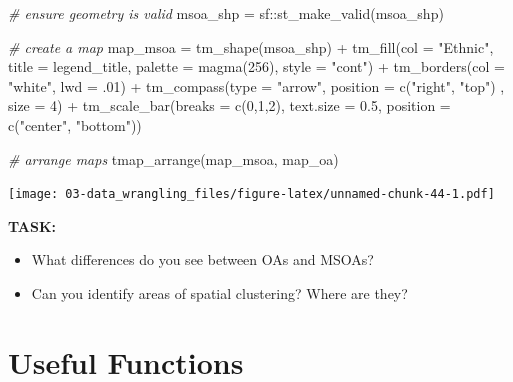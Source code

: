\documentclass[
]{book}
\newenvironment{Shaded}{\begin{snugshade}}{\end{snugshade}}
\newcommand{\AttributeTok}[1]{\textcolor[rgb]{0.77,0.63,0.00}{#1}}
\newcommand{\CommentTok}[1]{\textcolor[rgb]{0.56,0.35,0.01}{\textit{#1}}}
\newcommand{\DecValTok}[1]{\textcolor[rgb]{0.00,0.00,0.81}{#1}}
\newcommand{\FloatTok}[1]{\textcolor[rgb]{0.00,0.00,0.81}{#1}}
\newcommand{\FunctionTok}[1]{\textcolor[rgb]{0.00,0.00,0.00}{#1}}
\newcommand{\NormalTok}[1]{#1}
\newcommand{\OtherTok}[1]{\textcolor[rgb]{0.56,0.35,0.01}{#1}}
\newcommand{\SpecialCharTok}[1]{\textcolor[rgb]{0.00,0.00,0.00}{#1}}
\newcommand{\StringTok}[1]{\textcolor[rgb]{0.31,0.60,0.02}{#1}}
\providecommand{\tightlist}{%
  \setlength{\itemsep}{0pt}\setlength{\parskip}{0pt}}
\begin{document}
\begin{Shaded}
\begin{Highlighting}[]
\CommentTok{\# ensure geometry is valid}
\NormalTok{msoa\_shp }\OtherTok{=}\NormalTok{ sf}\SpecialCharTok{::}\FunctionTok{st\_make\_valid}\NormalTok{(msoa\_shp)}

\CommentTok{\# create a map}
\NormalTok{map\_msoa }\OtherTok{=} \FunctionTok{tm\_shape}\NormalTok{(msoa\_shp) }\SpecialCharTok{+}
  \FunctionTok{tm\_fill}\NormalTok{(}\AttributeTok{col =} \StringTok{"Ethnic"}\NormalTok{, }\AttributeTok{title =}\NormalTok{ legend\_title, }\AttributeTok{palette =} \FunctionTok{magma}\NormalTok{(}\DecValTok{256}\NormalTok{), }\AttributeTok{style =} \StringTok{"cont"}\NormalTok{) }\SpecialCharTok{+} 
  \FunctionTok{tm\_borders}\NormalTok{(}\AttributeTok{col =} \StringTok{"white"}\NormalTok{, }\AttributeTok{lwd =}\NormalTok{ .}\DecValTok{01}\NormalTok{)  }\SpecialCharTok{+} 
  \FunctionTok{tm\_compass}\NormalTok{(}\AttributeTok{type =} \StringTok{"arrow"}\NormalTok{, }\AttributeTok{position =} \FunctionTok{c}\NormalTok{(}\StringTok{"right"}\NormalTok{, }\StringTok{"top"}\NormalTok{) , }\AttributeTok{size =} \DecValTok{4}\NormalTok{) }\SpecialCharTok{+} 
  \FunctionTok{tm\_scale\_bar}\NormalTok{(}\AttributeTok{breaks =} \FunctionTok{c}\NormalTok{(}\DecValTok{0}\NormalTok{,}\DecValTok{1}\NormalTok{,}\DecValTok{2}\NormalTok{), }\AttributeTok{text.size =} \FloatTok{0.5}\NormalTok{, }\AttributeTok{position =}  \FunctionTok{c}\NormalTok{(}\StringTok{"center"}\NormalTok{, }\StringTok{"bottom"}\NormalTok{)) }

\CommentTok{\# arrange maps }
\FunctionTok{tmap\_arrange}\NormalTok{(map\_msoa, map\_oa) }
\end{Highlighting}
\end{Shaded}

\texttt{[image: 03-data\_wrangling\_files/figure-latex/unnamed-chunk-44-1.pdf]}

\textbf{TASK:}

\begin{itemize}
\tightlist
\item
  What differences do you see between OAs and MSOAs?
\item
  Can you identify areas of spatial clustering? Where are they?
\end{itemize}

\hypertarget{useful-functions}{%
\section{Useful Functions}\label{useful-functions}}
\end{document}
